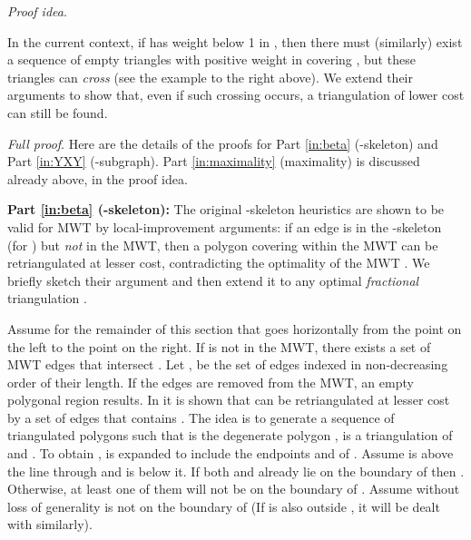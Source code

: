 \documentclass[final]{siamltex}
\newenvironment{proofidea}{\par{\it Proof idea}. \ignorespaces}{}
\newenvironment{fullproof}{\par{\it Full proof}. \ignorespaces}{\endproof}
\begin{document}
\begin{proofidea}
\begin{window}
    \hspace*{\parindent}
    In the current context, if  has weight below 1 in ,
    then there must (similarly) exist a sequence  of empty triangles
    with positive weight in  covering , 
    but these triangles can {\em cross} (see the example to the right above).
    We extend their arguments to show that, even if such
    crossing occurs, a triangulation of lower cost can still be found.\end{window}\end{proofidea}




\begin{fullproof}
Here are the details of the proofs for Part \ref{in:beta} (-skeleton) and Part \ref{in:YXY} (-subgraph).
Part \ref{in:maximality} (maximality) is discussed already above, in the proof idea.




\medskip
\noindent
{\bf Part \ref{in:beta} (-skeleton):}
The original -skeleton heuristics 
are shown to be valid for MWT by local-improvement arguments:
if an edge  is in the -skeleton (for ) but {\em not} in the MWT,
then a polygon  covering  within the MWT can be retriangulated at lesser cost,
contradicting the optimality of the MWT \cite{keil1994computing,cheng1996approaching}.
We briefly sketch their argument and then extend it to any optimal {\em fractional} triangulation .

Assume for the remainder of this section that  goes horizontally from 
the point  on the left to the point  on the right.
If  is not in the MWT, there exists a set of MWT edges that intersect . 
Let , be the set of edges indexed in  
non-decreasing order of their length. 
If the edges are removed from the MWT, an empty polygonal region  results. 
In \cite{keil1994computing,cheng1996approaching}
it is shown that 
 can be retriangulated at lesser cost by a set of edges that contains . 
The idea is to generate a sequence of triangulated 
polygons  such that  is the degenerate polygon ,  is 
a triangulation of  and . To obtain ,  is expanded 
to include the endpoints  and  of . Assume  is above the line through 
 and  is below it. 
If both  and  already lie on the boundary of  then . 
Otherwise, at least one of them will not be on the boundary of .
Assume without loss of generality  is not on the boundary of  
(If  is also outside , it will be dealt with similarly).


\end{fullproof}
\end{document}

